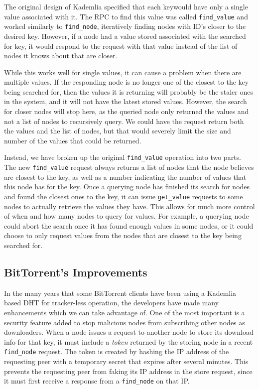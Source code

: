 \documentclass[conference]{IEEEtran}
\begin{document}
The original design of Kademlia specified that each keywould have
only a single value associated with it. The RPC to find this value
was called \texttt{find\_value} and worked similarly to
\texttt{find\_node}, iteratively finding nodes with ID's closer to
the desired key. However, if a node had a value stored associated
with the searched for key, it would respond to the request with that
value instead of the list of nodes it knows about that are closer.

While this works well for single values, it can cause a problem when
there are multiple values. If the responding node is no longer one
of the closest to the key being searched for, then the values it is
returning will probably be the staler ones in the system, and it
will not have the latest stored values. However, the search for
closer nodes will stop here, as the queried node only returned the
values and not a list of nodes to recursively query. We could have
the request return both the values and the list of nodes, but that
would severely limit the size and number of the values that could be
returned.

Instead, we have broken up the original \texttt{find\_value}
operation into two parts. The new \texttt{find\_value} request
always returns a list of nodes that the node believes are closest to
the key, as well as a number indicating the number of values that
this node has for the key. Once a querying node has finished its
search for nodes and found the closest ones to the key, it can issue
\texttt{get\_value} requests to some nodes to actually retrieve the
values they have. This allows for much more control of when and how
many nodes to query for values. For example, a querying node could
abort the search once it has found enough values in some nodes, or
it could choose to only request values from the nodes that are
closest to the key being searched for.

\subsection{BitTorrent's Improvements}
\label{bittorrent_dht}

In the many years that some BitTorrent clients have been using a
Kademlia based DHT for tracker-less operation, the developers have
made many enhancements which we can take advantage of. One of the
most important is a security feature added to stop malicious nodes
from subscribing other nodes as downloaders. When a node issues a
request to another node to store its download info for that key, it
must include a \emph{token} returned by the storing node in a recent
\texttt{find\_node} request. The token is created by hashing the IP
address of the requesting peer with a temporary secret that expires
after several minutes. This prevents the requesting peer from faking
its IP address in the store request, since it must first receive a
response from a \texttt{find\_node} on that IP.
\end{document}
